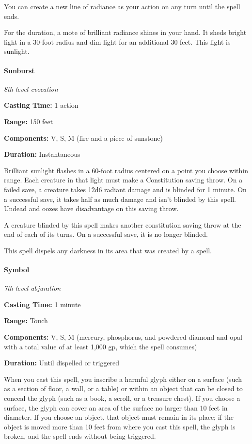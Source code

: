 \documentclass[
]{article}
\begin{document}
You can create a new line of radiance as your action on any turn until
the spell ends.

For the duration, a mote of brilliant radiance shines in your hand. It
sheds bright light in a 30-foot radius and dim light for an additional
30 feet. This light is sunlight.

\hypertarget{sunburst}{%
\paragraph{Sunburst}\label{sunburst}}

\emph{8th-level evocation}

\textbf{Casting Time:} 1 action

\textbf{Range:} 150 feet

\textbf{Components:} V, S, M (fire and a piece of sunstone)

\textbf{Duration:} Instantaneous

Brilliant sunlight flashes in a 60-foot radius centered on a point you
choose within range. Each creature in that light must make a
Constitution saving throw. On a failed save, a creature takes 12d6
radiant damage and is blinded for 1 minute. On a successful save, it
takes half as much damage and isn't blinded by this spell. Undead and
oozes have disadvantage on this saving throw.

A creature blinded by this spell makes another constitution saving throw
at the end of each of its turns. On a successful save, it is no longer
blinded.

This spell dispels any darkness in its area that was created by a spell.

\hypertarget{symbol}{%
\paragraph{Symbol}\label{symbol}}

\emph{7th-level abjuration}

\textbf{Casting Time:} 1 minute

\textbf{Range:} Touch

\textbf{Components:} V, S, M (mercury, phosphorus, and powdered diamond
and opal with a total value of at least 1,000 gp, which the spell
consumes)

\textbf{Duration:} Until dispelled or triggered

When you cast this spell, you inscribe a harmful glyph either on a
surface (such as a section of floor, a wall, or a table) or within an
object that can be closed to conceal the glyph (such as a book, a
scroll, or a treasure chest). If you choose a surface, the glyph can
cover an area of the surface no larger than 10 feet in diameter. If you
choose an object, that object must remain in its place; if the object is
moved more than 10 feet from where you cast this spell, the glyph is
broken, and the spell ends without being triggered.
\end{document}
